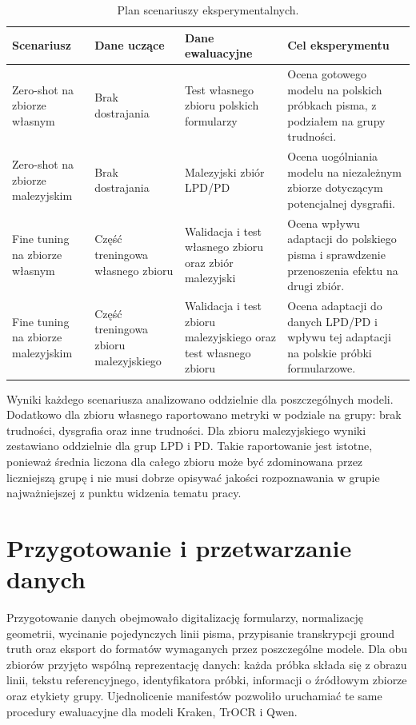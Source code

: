 \begin{table}[htbp]
    \centering
    \caption{Plan scenariuszy eksperymentalnych.}
    \label{tab:plan-scenariuszy-eksperymentalnych}
    \begin{tabular}{p{}p{}p{}p{}}
        \hline
        Scenariusz & Dane uczące & Dane ewaluacyjne & Cel eksperymentu \\
        \hline
        Zero-shot na zbiorze własnym & Brak dostrajania & Test własnego zbioru polskich formularzy & Ocena gotowego modelu na polskich próbkach pisma, z podziałem na grupy trudności. \\
        Zero-shot na zbiorze malezyjskim & Brak dostrajania & Malezyjski zbiór LPD/PD & Ocena uogólniania modelu na niezależnym zbiorze dotyczącym potencjalnej dysgrafii. \\
        Fine tuning na zbiorze własnym & Część treningowa własnego zbioru & Walidacja i test własnego zbioru oraz zbiór malezyjski & Ocena wpływu adaptacji do polskiego pisma i sprawdzenie przenoszenia efektu na drugi zbiór. \\
        Fine tuning na zbiorze malezyjskim & Część treningowa zbioru malezyjskiego & Walidacja i test zbioru malezyjskiego oraz test własnego zbioru & Ocena adaptacji do danych LPD/PD i wpływu tej adaptacji na polskie próbki formularzowe. \\
        \hline
    \end{tabular}
\end{table}

Wyniki każdego scenariusza analizowano oddzielnie dla poszczególnych modeli. Dodatkowo dla
zbioru własnego raportowano metryki w podziale na grupy: brak trudności, dysgrafia oraz inne
trudności. Dla zbioru malezyjskiego wyniki zestawiano oddzielnie dla grup LPD i PD. Takie
raportowanie jest istotne, ponieważ średnia liczona dla całego zbioru może być zdominowana przez
liczniejszą grupę i nie musi dobrze opisywać jakości rozpoznawania w grupie najważniejszej
z punktu widzenia tematu pracy.

\section{Przygotowanie i przetwarzanie danych}
\label{sec:przygotowanie-i-przetwarzanie-danych}

Przygotowanie danych obejmowało digitalizację formularzy, normalizację geometrii, wycinanie
pojedynczych linii pisma, przypisanie transkrypcji ground truth oraz eksport do formatów
wymaganych przez poszczególne modele. Dla obu zbiorów przyjęto wspólną reprezentację danych:
każda próbka składa się z obrazu linii, tekstu referencyjnego, identyfikatora próbki, informacji
o źródłowym zbiorze oraz etykiety grupy. Ujednolicenie manifestów pozwoliło uruchamiać te same
procedury ewaluacyjne dla modeli Kraken, TrOCR i Qwen.

